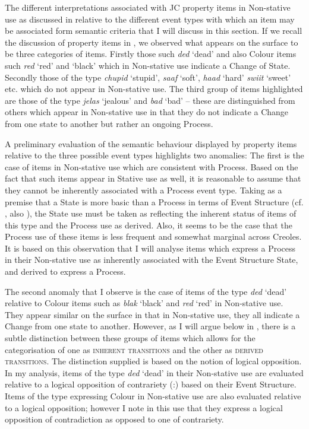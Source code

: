 The different interpretations associated with JC property items in Non-stative use as discussed in  relative to the different event types with which an item may be associated form semantic criteria that I will discuss in this section. If we recall the discussion of property items in , we observed what appears on the surface to be three categories of items. Firstly those such \textit{ded} `dead' and also Colour items such \textit{red} `red' and `black' which in Non-stative use indicate a Change of State. Secondly those of the type \textit{chupid} `stupid', \textit{saaf} `soft', \textit{haad} `hard' \textit{swiit} `sweet' etc. which do not appear in Non-stative use. The third group of items highlighted are those of the type \textit{jelas} `jealous' and \textit{bad} `bad' -- these are distinguished from others which appear in Non-stative use in that they do not indicate a Change from one state to another but rather an ongoing Process. 

A preliminary evaluation of the semantic behaviour displayed by property items relative to the three possible event types highlights two anomalies: The first is the case of items in Non-stative use which are consistent with Process. Based on the fact that such items appear in Stative use as well, it is reasonable to assume that they cannot be inherently associated with a Process event type. Taking as a premise that a State is more basic than a Process in terms of Event Structure (cf. \citealt{Pustejovsky1991}, also \citealt{Grimshaw1990}), the State use must be taken as reflecting the inherent status of items of this type and the Process use as derived. Also, it seems to be the case that the Process use of these items is less frequent and somewhat marginal across Creoles. It is based on this observation that I will analyse items which express a Process in their Non-stative use as inherently associated with the Event Structure State, and derived to express a Process. 

The second anomaly that I observe is the case of items of the type \textit{ded} `dead' relative to Colour items such as \textit{blak} `black' and \textit{red} `red' in Non-stative use. They appear similar on the surface in that in Non-stative use, they all indicate a Change from one state to another. However, as I will argue below in , there is a subtle distinction between these groups of items which allows for the categorisation of one as \textsc{inherent transitions} and the other as \textsc{derived transitions}. The distinction supplied is based on the notion of logical opposition. In my analysis, items of the type \textit{ded} `dead' in their Non-stative use are evaluated relative to a logical opposition of contrariety (\DEAD:\ALIVE) based on their Event Structure. Items of the type expressing Colour in Non-stative use are also evaluated relative to a logical opposition; however I note in this use that they express a logical opposition of contradiction as opposed to one of contrariety. 

